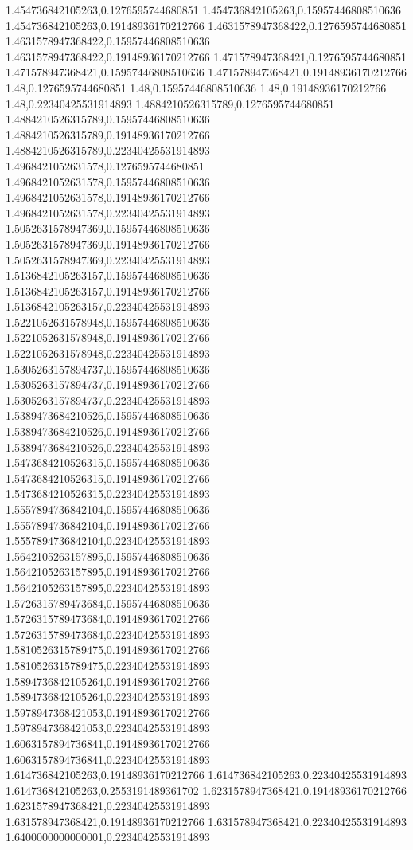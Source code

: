 1.454736842105263,0.1276595744680851
1.454736842105263,0.15957446808510636
1.454736842105263,0.19148936170212766
1.4631578947368422,0.1276595744680851
1.4631578947368422,0.15957446808510636
1.4631578947368422,0.19148936170212766
1.471578947368421,0.1276595744680851
1.471578947368421,0.15957446808510636
1.471578947368421,0.19148936170212766
1.48,0.1276595744680851
1.48,0.15957446808510636
1.48,0.19148936170212766
1.48,0.22340425531914893
1.4884210526315789,0.1276595744680851
1.4884210526315789,0.15957446808510636
1.4884210526315789,0.19148936170212766
1.4884210526315789,0.22340425531914893
1.4968421052631578,0.1276595744680851
1.4968421052631578,0.15957446808510636
1.4968421052631578,0.19148936170212766
1.4968421052631578,0.22340425531914893
1.5052631578947369,0.15957446808510636
1.5052631578947369,0.19148936170212766
1.5052631578947369,0.22340425531914893
1.5136842105263157,0.15957446808510636
1.5136842105263157,0.19148936170212766
1.5136842105263157,0.22340425531914893
1.5221052631578948,0.15957446808510636
1.5221052631578948,0.19148936170212766
1.5221052631578948,0.22340425531914893
1.5305263157894737,0.15957446808510636
1.5305263157894737,0.19148936170212766
1.5305263157894737,0.22340425531914893
1.5389473684210526,0.15957446808510636
1.5389473684210526,0.19148936170212766
1.5389473684210526,0.22340425531914893
1.5473684210526315,0.15957446808510636
1.5473684210526315,0.19148936170212766
1.5473684210526315,0.22340425531914893
1.5557894736842104,0.15957446808510636
1.5557894736842104,0.19148936170212766
1.5557894736842104,0.22340425531914893
1.5642105263157895,0.15957446808510636
1.5642105263157895,0.19148936170212766
1.5642105263157895,0.22340425531914893
1.5726315789473684,0.15957446808510636
1.5726315789473684,0.19148936170212766
1.5726315789473684,0.22340425531914893
1.5810526315789475,0.19148936170212766
1.5810526315789475,0.22340425531914893
1.5894736842105264,0.19148936170212766
1.5894736842105264,0.22340425531914893
1.5978947368421053,0.19148936170212766
1.5978947368421053,0.22340425531914893
1.6063157894736841,0.19148936170212766
1.6063157894736841,0.22340425531914893
1.614736842105263,0.19148936170212766
1.614736842105263,0.22340425531914893
1.614736842105263,0.2553191489361702
1.6231578947368421,0.19148936170212766
1.6231578947368421,0.22340425531914893
1.631578947368421,0.19148936170212766
1.631578947368421,0.22340425531914893
1.6400000000000001,0.22340425531914893
